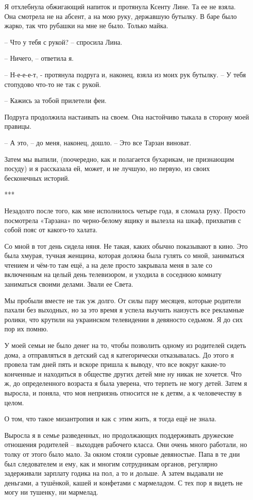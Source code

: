 \documentclass[
]{book}
\begin{document}
Я отхлебнула обжигающий напиток и протянула Ксенту Лине. Та ее не взяла. Она смотрела не на абсент, а на мою руку, державшую бутылку. В баре было жарко, так что рубашки на мне не было. Только майка.

-- Что у тебя с рукой? -- спросила Лина.

-- Ничего, -- ответила я.

-- Н-е-е-е-т, - протянула подруга и, наконец, взяла из моих рук бутылку. -- У тебя стопудово что-то не так с рукой.

-- Кажись за тобой прилетели феи.

Подруга продолжила настаивать на своем. Она настойчиво тыкала в сторону моей правицы.

-- А это, -- до меня, наконец, дошло. -- Это все Тарзан виноват.

Затем мы выпили, (поочередно, как и полагается бухарикам, не признающим посуду) и я рассказала ей, может, и не лучшую, но первую, из своих бесконечных историй.

***

Незадолго после того, как мне исполнилось четыре года, я сломала руку. Просто посмотрела «Тарзана» по черно-белому ящику и вылезла на шкаф, прихватив с собой пояс от какого-то халата.

Со мной в тот день сидела няня. Не такая, каких обычно показывают в кино. Это была хмурая, тучная женщина, которая должна была гулять со мной, заниматься чтением и чём-то там ещё, а на деле просто закрывала меня в зале со включенным на целый день телевизором, и уходила в соседнюю комнату заниматься своими делами. Звали ее Света.

Мы пробыли вместе не так уж долго. От силы пару месяцев, которые родители пахали без выходных, но за это время я успела выучить наизусть все рекламные ролики, что крутили на украинском телевидении в девяносто седьмом. Я до сих пор их помню.

У моей семьи не было денег на то, чтобы позволить одному из родителей сидеть дома, а отправляться в детский сад я категорически отказывалась. До этого я провела там дней пять и вскоре пришла к выводу, что все вокруг какие-то конченные и находиться в обществе других детей мне ну никак не хочется. Что ж, до определенного возраста я была уверена, что терпеть не могу детей. Затем я выросла, и поняла, что моя неприязнь относится не к детям, а к человечеству в целом.

О том, что такое мизантропия и как с этим жить, я тогда ещё не знала.

Выросла я в семье разведенных, но продолжающих поддерживать дружеские отношения родителей -- выходцев рабочего класса. Они очень много работали, но толку от этого было мало. За окном стояли суровые девяностые. Папа в те дни был следователем и ему, как и многим сотрудникам органов, регулярно задерживали зарплату годика на пол, а то и дольше. А затем выдавали не деньгами, а тушёнкой, кашей и конфетами с мармеладом. С тех пор я видеть не могу ни тушенку, ни мармелад.
\end{document}
